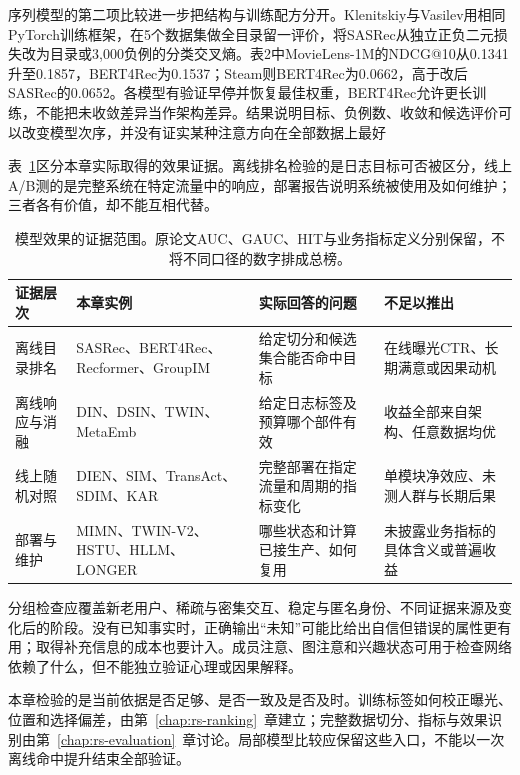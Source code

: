 序列模型的第二项比较进一步把结构与训练配方分开。Klenitskiy与Vasilev用相同PyTorch训练框架，在5个数据集做全目录留一评价，将SASRec从独立正负二元损失改为目录或3,000负例的分类交叉熵。表2中MovieLens-1M的NDCG@10从0.1341升至0.1857，BERT4Rec为0.1537；Steam则BERT4Rec为0.0662，高于改后SASRec的0.0652。各模型有验证早停并恢复最佳权重，BERT4Rec允许更长训练，不能把未收敛差异当作架构差异。结果说明目标、负例数、收敛和候选评价可以改变模型次序，并没有证实某种注意方向在全部数据上最好

表~\ref{tab:rs-understanding-evidence-levels}区分本章实际取得的效果证据。离线排名检验的是日志目标可否被区分，线上A/B测的是完整系统在特定流量中的响应，部署报告说明系统被使用及如何维护；三者各有价值，却不能互相代替。

\begin{table}[htbp]
  \centering
  \small
  \begin{tabularx}{\linewidth}{@{}lXXX@{}}
    \toprule
    证据层次 & 本章实例 & 实际回答的问题 & 不足以推出 \\
    \midrule
    离线目录排名 & SASRec、BERT4Rec、Recformer、GroupIM & 给定切分和候选集合能否命中目标 & 在线曝光CTR、长期满意或因果动机 \\
    离线响应与消融 & DIN、DSIN、TWIN、MetaEmb & 给定日志标签及预算哪个部件有效 & 收益全部来自架构、任意数据均优 \\
    线上随机对照 & DIEN、SIM、TransAct、SDIM、KAR & 完整部署在指定流量和周期的指标变化 & 单模块净效应、未测人群与长期后果 \\
    部署与维护 & MIMN、TWIN-V2、HSTU、HLLM、LONGER & 哪些状态和计算已接生产、如何复用 & 未披露业务指标的具体含义或普遍收益 \\
    \bottomrule
  \end{tabularx}
  \caption{模型效果的证据范围。原论文AUC、GAUC、HIT与业务指标定义分别保留，不将不同口径的数字排成总榜。}
  \label{tab:rs-understanding-evidence-levels}
\end{table}

分组检查应覆盖新老用户、稀疏与密集交互、稳定与匿名身份、不同证据来源及变化后的阶段。没有已知事实时，正确输出“未知”可能比给出自信但错误的属性更有用；取得补充信息的成本也要计入。成员注意、图注意和兴趣状态可用于检查网络依赖了什么，但不能独立验证心理或因果解释。

本章检验的是当前依据是否足够、是否一致及是否及时。训练标签如何校正曝光、位置和选择偏差，由第~\ref{chap:rs-ranking}~章建立；完整数据切分、指标与效果识别由第~\ref{chap:rs-evaluation}~章讨论。局部模型比较应保留这些入口，不能以一次离线命中提升结束全部验证。

